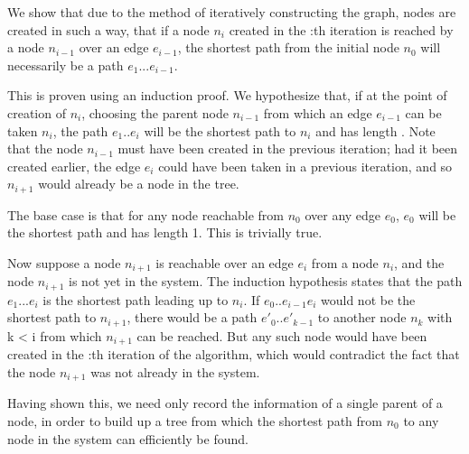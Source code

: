  
We show that due to the method of iteratively constructing the graph, nodes are created in such a way, that if a node $n_{i}$ created in the :th iteration is reached by a node $n_{i-1}$ over an edge $e_{i-1}$, the shortest path from the initial node $n_0$ will necessarily be a path $e_1...e_{i-1}$.
 
 This is proven using an induction proof. We hypothesize that, if at the point of creation of $n_i$, choosing the parent node $n_{i-1}$ from which an edge $e_{i-1}$ can be taken $n_i$, the path $e_1..e_{i}$ will be the shortest path to $n_i$ and has length . Note that the node $n_{i-1}$ must have been created in the previous iteration; had it been created earlier, the edge $e_i$ could have been taken in a previous iteration, and so $n_{i+1}$ would already be a node in the tree.
 
The base case is that for any node reachable from $n_0$ over any edge $e_0$, $e_0$ will be the shortest path and has length 1. This is trivially true.
 
Now suppose a node $n_{i+1}$ is reachable over an edge $e_i$ from a node $n_i$, and the node $n_{i+1}$ is not yet in the system. The induction hypothesis states that the path $e_1...e_i$ is the shortest path leading up to $n_i$. If $e_0..e_{i-1}e_i$ would not be the shortest path to $n_{i+1}$, there would be a path $e'_0..e'_{k-1}$ to another node $n_k$ with k < i from which $n_{i+1}$ can be reached. But any such node would have been created in the :th iteration of the algorithm, which would contradict the fact that the node $n_{i+1}$ was not already in the system.
 
Having shown this, we need only record the information of a single parent of a node, in order to build up a tree from which the shortest path from $n_0$ to any node in the system can efficiently be found.


\swreceiver

\swobserver

\swsender
